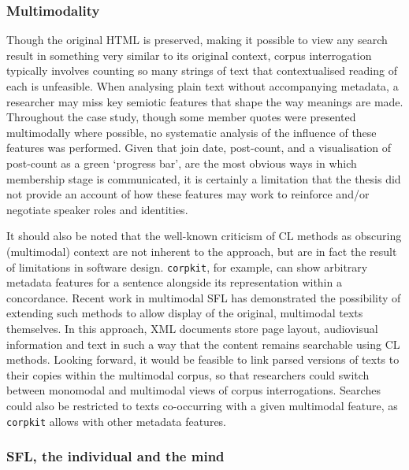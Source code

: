 \subsubsection{Multimodality}

Though the original \gls{HTML} is preserved, making it possible to view any search result in something very similar to its original context, \gls{corpus} interrogation typically involves counting so many strings of text that contextualised reading of each is unfeasible. When analysing plain text without accompanying metadata, a researcher may miss key semiotic features that shape the way meanings are made. Throughout the case study, though some member quotes were presented multimodally where possible, no systematic analysis of the influence of these features was performed. Given that join date, post\hyp{}count, and a visualisation of post\hyp{}count as a green `progress bar', are the most obvious ways in which membership stage is communicated, it is certainly a limitation that the thesis did not provide an account of how these features may work to reinforce and\slash or negotiate speaker roles and identities.

It should also be noted that the well\hyp{}known criticism of \gls{CL} methods as obscuring (multimodal) context are not inherent to the approach, but are in fact the result of limitations in software design. \texttt{corpkit}, for example, can show arbitrary metadata features for a sentence alongside its representation within a concordance. Recent work in multimodal \gls{SFL} \cite[e.g.][]{hiippala2015,hiippala2016,ohalloran_multimodal_2013} has demonstrated the possibility of extending such methods to allow display of the original, multimodal texts themselves. In this approach, \gls{XML} documents store page layout, audiovisual information and text in such a way that the content remains searchable using \gls{CL} methods. Looking forward, it would be feasible to link parsed versions of texts to their copies within the multimodal \gls{corpus}, so that researchers could switch between monomodal and multimodal views of \gls{corpus} interrogations. Searches could also be restricted to texts co\hyp{}occurring with a given multimodal feature, as \texttt{corpkit} allows with other metadata features. 


\subsubsection{SFL, the individual and the mind}

